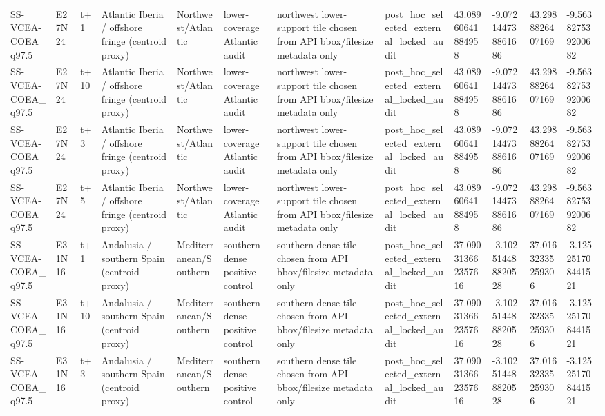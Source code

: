 \begin{landscape}
\begin{longtable}{llllllllllll}
SS-VCEA-COEA\_q97.5 & E27N24 & t+1 & Atlantic Iberia / offshore fringe (centroid proxy) & Northwest/Atlantic & lower-coverage Atlantic audit & northwest lower-support tile chosen from API bbox/filesize metadata only & post\_hoc\_selected\_external\_locked\_audit & 43.08960641884958 & -9.072144738861686 & 43.2988826407169 & -9.563827539200682 \\
SS-VCEA-COEA\_q97.5 & E27N24 & t+10 & Atlantic Iberia / offshore fringe (centroid proxy) & Northwest/Atlantic & lower-coverage Atlantic audit & northwest lower-support tile chosen from API bbox/filesize metadata only & post\_hoc\_selected\_external\_locked\_audit & 43.08960641884958 & -9.072144738861686 & 43.2988826407169 & -9.563827539200682 \\
SS-VCEA-COEA\_q97.5 & E27N24 & t+3 & Atlantic Iberia / offshore fringe (centroid proxy) & Northwest/Atlantic & lower-coverage Atlantic audit & northwest lower-support tile chosen from API bbox/filesize metadata only & post\_hoc\_selected\_external\_locked\_audit & 43.08960641884958 & -9.072144738861686 & 43.2988826407169 & -9.563827539200682 \\
SS-VCEA-COEA\_q97.5 & E27N24 & t+5 & Atlantic Iberia / offshore fringe (centroid proxy) & Northwest/Atlantic & lower-coverage Atlantic audit & northwest lower-support tile chosen from API bbox/filesize metadata only & post\_hoc\_selected\_external\_locked\_audit & 43.08960641884958 & -9.072144738861686 & 43.2988826407169 & -9.563827539200682 \\
SS-VCEA-COEA\_q97.5 & E31N16 & t+1 & Andalusia / southern Spain (centroid proxy) & Mediterranean/Southern & southern dense positive control & southern dense tile chosen from API bbox/filesize metadata only & post\_hoc\_selected\_external\_locked\_audit & 37.090313662357616 & -3.102514488820528 & 37.01632335259306 & -3.125251708441521 \\
SS-VCEA-COEA\_q97.5 & E31N16 & t+10 & Andalusia / southern Spain (centroid proxy) & Mediterranean/Southern & southern dense positive control & southern dense tile chosen from API bbox/filesize metadata only & post\_hoc\_selected\_external\_locked\_audit & 37.090313662357616 & -3.102514488820528 & 37.01632335259306 & -3.125251708441521 \\
SS-VCEA-COEA\_q97.5 & E31N16 & t+3 & Andalusia / southern Spain (centroid proxy) & Mediterranean/Southern & southern dense positive control & southern dense tile chosen from API bbox/filesize metadata only & post\_hoc\_selected\_external\_locked\_audit & 37.090313662357616 & -3.102514488820528 & 37.01632335259306 & -3.125251708441521 \\

\end{longtable}
\end{landscape}
